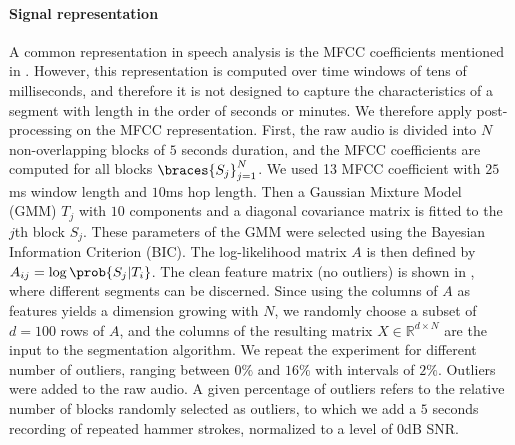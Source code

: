 \paragraph{Signal representation} A common representation in speech analysis is the MFCC coefficients mentioned in . However, this representation is computed over time windows of tens of milliseconds, and therefore it is not designed to capture the characteristics of a segment with length in the order of seconds or minutes. We therefore apply post-processing on the MFCC representation. First, the raw audio is divided
into $N$ non-overlapping blocks of $5$ seconds duration, and the MFCC coefficients are computed for all blocks $\braces{S_j}_{j=1}^N$. We used 13 MFCC coefficient with $25$ms window length and $10$ms hop length. Then a Gaussian Mixture Model (GMM) $T_j$ with $10$ components and a diagonal covariance matrix is
fitted to the $j$th block $S_j$. These parameters of the GMM were selected using the Bayesian Information Criterion (BIC). The log-likelihood matrix $A$
is then defined by $A_{ij}=\log\prob{S_j|T_i}$. %
The clean feature matrix (no outliers) is shown in
, where different segments can be discerned.
Since using the columns of $A$ as features yields a dimension growing %
with $N$, we randomly choose a subset of $d=100$ rows
of $A$, and the columns of the resulting matrix $X\in\mathbb{R}^{d\times N}$ are the
input to the segmentation algorithm.
We repeat the experiment for different number of outliers, ranging between $0\%$ and $16\%$ with intervals of $2\%$.
Outliers were added to the raw audio. A given percentage of outliers refers to the relative
number of blocks randomly selected as outliers, to which we add a $5$ seconds recording of repeated hammer strokes,
normalized to a level of $0$dB SNR.

